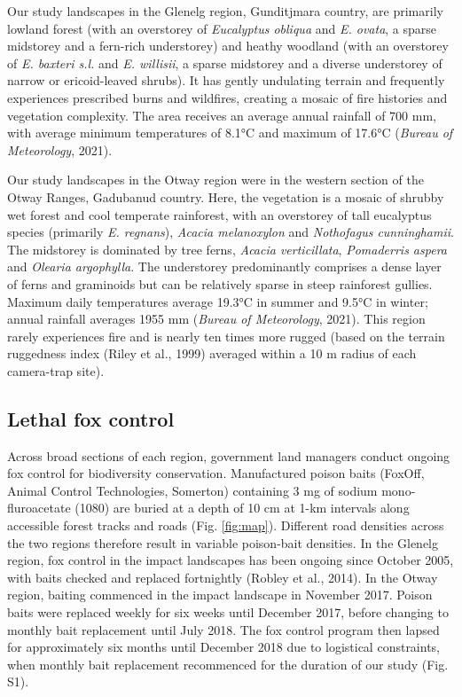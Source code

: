 \documentclass[]{elsarticle} %
\begin{document}
Our study landscapes in the Glenelg region, Gunditjmara country, are primarily lowland forest (with an overstorey of \emph{Eucalyptus obliqua} and \emph{E. ovata}, a sparse midstorey and a fern-rich understorey) and heathy woodland (with an overstorey of \emph{E. baxteri s.l.} and \emph{E. willisii}, a sparse midstorey and a diverse understorey of narrow or ericoid-leaved shrubs). It has gently undulating terrain and frequently experiences prescribed burns and wildfires, creating a mosaic of fire histories and vegetation complexity. The area receives an average annual rainfall of 700 mm, with average minimum temperatures of 8.1°C and maximum of 17.6°C (\emph{Bureau of Meteorology}, 2021).

Our study landscapes in the Otway region were in the western section of the Otway Ranges, Gadubanud country. Here, the vegetation is a mosaic of shrubby wet forest and cool temperate rainforest, with an overstorey of tall eucalyptus species (primarily \emph{E. regnans}), \emph{Acacia melanoxylon} and \emph{Nothofagus cunninghamii}. The midstorey is dominated by tree ferns, \emph{Acacia verticillata}, \emph{Pomaderris aspera} and \emph{Olearia argophylla}. The understorey predominantly comprises a dense layer of ferns and graminoids but can be relatively sparse in steep rainforest gullies. Maximum daily temperatures average 19.3°C in summer and 9.5°C in winter; annual rainfall averages 1955 mm (\emph{Bureau of Meteorology}, 2021). This region rarely experiences fire and is nearly ten times more rugged (based on the terrain ruggedness index (Riley et al., 1999) averaged within a 10 m radius of each camera-trap site).

\hypertarget{lethal-fox-control}{%
\subsection{Lethal fox control}\label{lethal-fox-control}}

Across broad sections of each region, government land managers conduct ongoing fox control for biodiversity conservation. Manufactured poison baits (FoxOff, Animal Control Technologies, Somerton) containing 3 mg of sodium mono-fluroacetate (1080) are buried at a depth of 10 cm at 1-km intervals along accessible forest tracks and roads (Fig. \ref{fig:map}). Different road densities across the two regions therefore result in variable poison-bait densities. In the Glenelg region, fox control in the impact landscapes has been ongoing since October 2005, with baits checked and replaced fortnightly (Robley et al., 2014). In the Otway region, baiting commenced in the impact landscape in November 2017. Poison baits were replaced weekly for six weeks until December 2017, before changing to monthly bait replacement until July 2018. The fox control program then lapsed for approximately six months until December 2018 due to logistical constraints, when monthly bait replacement recommenced for the duration of our study (Fig. S1).
\end{document}
